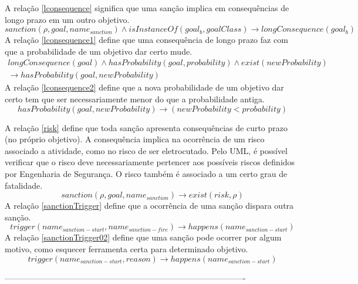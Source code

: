 \documentclass[a0,portrait]{a0poster}
\begin{document}
\begin{multicols}{2}
A relação \ref{lconsequence} significa que uma sanção implica em consequências de longo prazo em um outro objetivo.
\begin{equation}\label{lconsequence}
		  sanction(\rho,goal,name_{sanction}) \wedge isInstanceOf(goal_{b},goalClass) \to longConsequence(goal_{b}) 
\end{equation}
A relação \ref{lconsequence1} define que uma consequência de longo prazo faz com que a probabilidade de um objetivo dar certo
mude.
\begin{eqnarray}\label{lconsequence1}
	longConsequence(goal) \wedge hasProbability(goal,probability) \wedge exist(newProbability) \nonumber \\ 
	\to hasProbability(goal,newProbability)
\end{eqnarray}
A relação \ref{lconsequence2} define que a nova probabilidade de um objetivo dar certo tem que ser necessariamente menor
do que a probabilidade antiga.
\begin{equation}\label{lconsequence2}
	 hasProbability(goal,newProbability)\to (newProbability < probability)
\end{equation}


A relação \ref{risk} define que toda sanção apresenta consequências de curto prazo (no próprio objetivo). A consequência
implica na ocorrência de um risco associado a atividade, como no risco de ser eletrocutado. Pelo UML, é possível verificar
que o risco deve necessariamente pertencer aos possíveis riscos definidos por Engenharia de Segurança. O risco também 
é associado a um certo grau de fatalidade.
\begin{equation}\label{risk}
	sanction(\rho,goal,name_{sanction}) \to exist(risk,\rho) 
\end{equation}
A relação \ref{sanctionTrigger} define que a ocorrência de uma sanção dispara outra sanção.
\begin{equation}\label{sanctionTrigger}
	trigger(name_{sanction-start},name_{sanction-fire}) \to happens(name_{sanction-start})
\end{equation}
A relação \ref{sanctionTrigger02} define que uma sanção pode ocorrer por algum motivo, como esquecer ferramenta certa para determinado objetivo.
\begin{equation}\label{sanctionTrigger02}
	trigger(name_{sanction-start},reason) \to happens(name_{sanction-start})
\end{equation}


----------------------------------------------------------------------------------------

\end{multicols}
\end{document}
